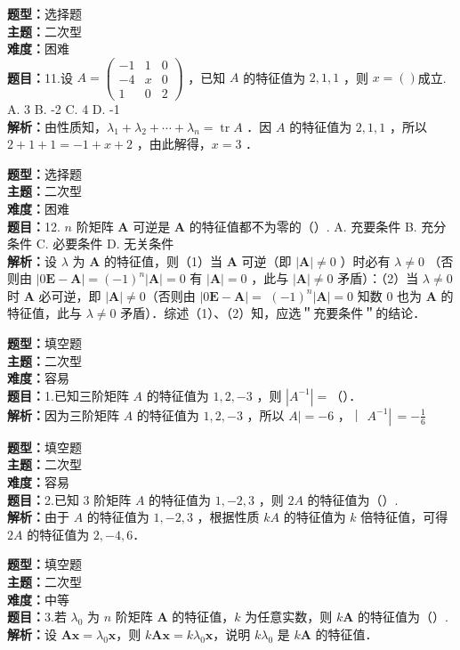 \documentclass{ctexart}
\newenvironment{question}[5]{%
	\noindent\textbf{题型：}#1\\
	\textbf{主题：}#2\\
	\textbf{难度：}#3\\
	\textbf{题目：}#4\\
	\textbf{解析：}#5\\
	\vspace{1em}
}{}
\begin{document}
	
	
	
	
	
	\begin{question}
		{选择题}
		{二次型}
		{困难}
		{11.设 \(A=\left(\begin{array}{ccc}-1 & 1 & 0 \\ -4 & x & 0 \\ 1 & 0 & 2\end{array}\right)\) ，已知 \(A\) 的特征值为 \(2,1,1\) ，则 \(x=()\)成立. 
			A. 3
			B. -2
			C. 4
			D. -1}
		{由性质知，\(\lambda_1+\lambda_2+\cdots+\lambda_n=\operatorname{tr} A\) ．因 \(A\) 的特征值为 \(2,1,1\) ，所以 \(2+1+1=-1+x+2\) ，由此解得，\(x=3\) ．}
	\end{question}
	
	
	
	\begin{question}
		{选择题}
		{二次型}
		{困难}
		{12. \(n\) 阶矩阵 \(\mathbf{A}\) 可逆是 \(\mathbf{A}\) 的特征值都不为零的（）. 
			A. 充要条件
			B. 充分条件
			C. 必要条件
			D. 无关条件}
		{设 \(\lambda\) 为 \(\mathbf{A}\) 的特征值，则（1）当 \(\mathbf{A}\) 可逆（即 \(|\mathbf{A}| \neq 0\) ）时必有 \(\lambda \neq 0\) （否则由 \(|0 \mathbf{E}-\mathbf{A}|=(-1)^n|\mathbf{A}|=0\) 有 \(|\mathbf{A}|=0\) ，此与 \(|\mathbf{A}| \neq 0\) 矛盾）：（2）当 \(\lambda \neq 0\) 时 \(\mathbf{A}\) 必可逆，即 \(|\mathbf{A}| \neq 0\)（否则由 \(|0 \mathbf{E}-\mathbf{A}|=\) \((-1)^n|\mathbf{A}|=0\) 知数 0 也为 \(\mathbf{A}\) 的特征值，此与 \(\lambda \neq 0\) 矛盾）．综述（1）、（2）知，应选＂充要条件＂的结论．}
	\end{question}
	
	
	
	
	\begin{question}
		{填空题}
		{二次型}
		{容易}
		{1.已知三阶矩阵 \(A\) 的特征值为 \(1,2,-3\) ，则 \(\left|A^{-1}\right|=\)（）．}
		{因为三阶矩阵 \(A\) 的特征值为 \(1,2,-3\) ，所以 \(A \mid=-6\) ，｜ \(A^{-1} \left\lvert\,=-\frac{1}{6}\right.\)}
	\end{question}
	
	\begin{question}
		{填空题}
		{二次型}
		{容易}
		{2.已知 3 阶矩阵 \(A\) 的特征值为 \(1,-2,3\) ，则 \(2A\) 的特征值为（）. }
		{由于 \(A\) 的特征值为 \(1,-2,3\) ，根据性质 \(kA\) 的特征值为 \(k\) 倍特征值，可得 \(2A\) 的特征值为 \(2, -4, 6\)．}
	\end{question}
	
	\begin{question}
		{填空题}
		{二次型}
		{中等}
		{3.若 \(\lambda_0\) 为 \(n\) 阶矩阵 \(\mathbf{A}\) 的特征值，\(k\) 为任意实数，则 \(k\mathbf{A}\) 的特征值为（）. }
		{设 \(\mathbf{A}\mathbf{x} = \lambda_0 \mathbf{x}\)，则 \(k\mathbf{A}\mathbf{x} = k\lambda_0 \mathbf{x}\)，说明 \(k\lambda_0\) 是 \(k\mathbf{A}\) 的特征值．}
	\end{question}
	
\end{document}
